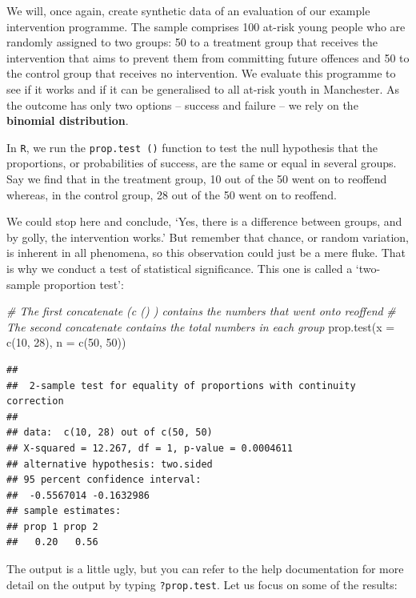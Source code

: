 \documentclass[
]{book}
\newenvironment{Shaded}{\begin{snugshade}}{\end{snugshade}}
\newcommand{\AttributeTok}[1]{\textcolor[rgb]{0.77,0.63,0.00}{#1}}
\newcommand{\CommentTok}[1]{\textcolor[rgb]{0.56,0.35,0.01}{\textit{#1}}}
\newcommand{\DecValTok}[1]{\textcolor[rgb]{0.00,0.00,0.81}{#1}}
\newcommand{\FunctionTok}[1]{\textcolor[rgb]{0.00,0.00,0.00}{#1}}
\newcommand{\NormalTok}[1]{#1}
\begin{document}
We will, once again, create synthetic data of an evaluation of our example intervention programme. The sample comprises 100 at-risk young people who are randomly assigned to two groups: 50 to a treatment group that receives the intervention that aims to prevent them from committing future offences and 50 to the control group that receives no intervention. We evaluate this programme to see if it works and if it can be generalised to all at-risk youth in Manchester. As the outcome has only two options -- success and failure -- we rely on the \textbf{binomial distribution}.

In \texttt{R}, we run the \texttt{prop.test\ ()} function to test the null hypothesis that the proportions, or probabilities of success, are the same or equal in several groups. Say we find that in the treatment group, 10 out of the 50 went on to reoffend whereas, in the control group, 28 out of the 50 went on to reoffend.

We could stop here and conclude, `Yes, there is a difference between groups, and by golly, the intervention works.' But remember that chance, or random variation, is inherent in all phenomena, so this observation could just be a mere fluke. That is why we conduct a test of statistical significance. This one is called a `two-sample proportion test':

\begin{Shaded}
\begin{Highlighting}[]
\CommentTok{\# The first concatenate (c () ) contains the numbers that went onto reoffend}
\CommentTok{\# The second concatenate contains the total numbers in each group}
\FunctionTok{prop.test}\NormalTok{(}\AttributeTok{x =} \FunctionTok{c}\NormalTok{(}\DecValTok{10}\NormalTok{, }\DecValTok{28}\NormalTok{), }\AttributeTok{n =} \FunctionTok{c}\NormalTok{(}\DecValTok{50}\NormalTok{, }\DecValTok{50}\NormalTok{))}
\end{Highlighting}
\end{Shaded}

\begin{verbatim}
## 
##  2-sample test for equality of proportions with continuity correction
## 
## data:  c(10, 28) out of c(50, 50)
## X-squared = 12.267, df = 1, p-value = 0.0004611
## alternative hypothesis: two.sided
## 95 percent confidence interval:
##  -0.5567014 -0.1632986
## sample estimates:
## prop 1 prop 2 
##   0.20   0.56
\end{verbatim}

The output is a little ugly, but you can refer to the help documentation for more detail on the output by typing \texttt{?prop.test}. Let us focus on some of the results:
\end{document}
